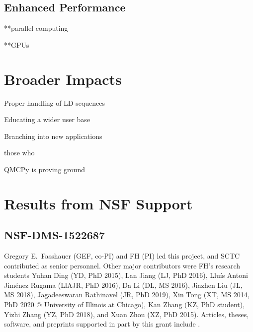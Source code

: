\documentclass[11pt]{NSFamsart}
\begin{document}
\subsection{Enhanced Performance}
**parallel computing


**GPUs






\section{Broader Impacts}

Proper handling of LD sequences 

Educating a wider user base

Branching into new applications

those who

QMCPy is proving ground














\section{Results from NSF Support} \label{sec:prior_work}

\subsection{NSF-DMS-1522687
} \label{sec:Previous}

Gregory E.\ Fasshauer (GEF, co-PI) and FH (PI) led this project, and SCTC contributed as senior personnel.  Other major contributors were FH's research students Yuhan Ding (YD, PhD 2015), Lan Jiang (LJ, PhD 2016), 
Llu\'is Antoni Jim\'enez Rugama (LlAJR, PhD 2016), Da Li (DL, MS 2016), Jiazhen Liu (JL, MS 2018), Jagadeeswaran Rathinavel (JR, 
PhD 2019), Xin Tong (XT, MS 2014, PhD 2020 @ University of Illinois at Chicago), Kan Zhang (KZ, PhD student), Yizhi Zhang (YZ, PhD 2018), and Xuan Zhou (XZ, PhD 2015).  Articles, theses,  
software, and preprints supported in 
part by this 
grant 
include 
\cite{ala_augmented_2017, 
	ChoEtal17a,
	ChoEtal20a,
	Din15a, 
	DinHic20a,
	GilEtal16a,
	Hic17a,
	HicJag18b,
	HicJim16a,
	HicEtal18a,
	HicEtal17a,
	HicKriWoz19a,
	RatHic19a,
	GilJim16b,
	JimHic16a,
	JohFasHic18a,
	Li16a,
	Liu17a,
	MarEtal18a,
	mccourt_stable_2017,
	MCCEtal19a,
	mishra_hybrid_2018,
	MisEtal19a,
	rashidinia_stable_2016,
	rashidinia_stable_2018,
	Zha18a,
	Zha17a,
	Zho15a,
	ZhoHic15a}.
\end{document}
